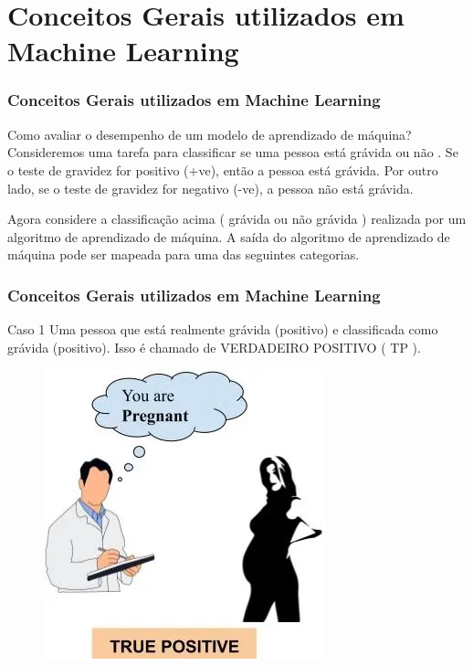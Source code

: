 \documentclass{beamer}
\begin{document}
	
\section{Conceitos Gerais utilizados em Machine Learning}

\begin{frame}
	\frametitle{Conceitos Gerais utilizados em Machine Learning}
	\begin{block}{Como avaliar o desempenho de um modelo de aprendizado de máquina?}
		Consideremos uma tarefa para classificar se uma pessoa está grávida ou não . Se o teste de gravidez for positivo (+ve), então a pessoa está grávida. Por outro lado, se o teste de gravidez for negativo (-ve), a pessoa não está grávida.
		
		Agora considere a classificação acima ( grávida ou não grávida ) realizada por um algoritmo de aprendizado de máquina. A saída do algoritmo de aprendizado de máquina pode ser mapeada para uma das seguintes categorias.
	\end{block}
\end{frame}
	
\begin{frame}
	\frametitle{Conceitos Gerais utilizados em Machine Learning}
	\begin{block}{Caso 1}
		Uma pessoa que está realmente grávida (positivo) e classificada como grávida (positivo). Isso é chamado de VERDADEIRO POSITIVO ( TP ).
	\end{block}
	\begin{figure}
		\centering
		\includegraphics[width=0.4\linewidth]{figures/True_positive}
	\end{figure}

\end{frame}
	
\end{document}
